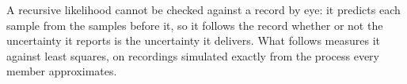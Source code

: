 
A recursive likelihood cannot be checked against a record by eye: it predicts each sample from the
samples before it, so it follows the record whether or not the uncertainty it reports is the
uncertainty it delivers. What follows measures it against least squares, on recordings simulated
exactly from the process every member approximates.

